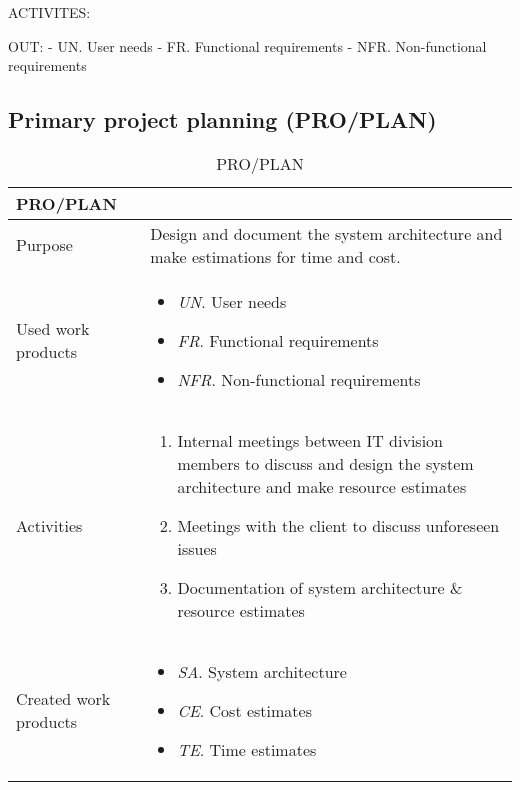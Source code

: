 ACTIVITES:


OUT:
    - UN. User needs
    - FR. Functional requirements
    - NFR. Non-functional requirements

\newpage
\subsection{Primary project planning (PRO/PLAN)}

\begin{table}[h!]
\begin{tabular}{l|p{}}
\hline
\textbf{PRO/PLAN}        & \textbf{} \\ \hline
Purpose & Design and document the system architecture and make estimations for time and cost.   \\ \hline
Used work products    &      
\begin{itemize}
    \item \textit{UN}. User needs
    \item \textit{FR}. Functional requirements
    \item \textit{NFR}. Non-functional requirements
\end{itemize}
\\ \hline
Activities            &   
\begin{enumerate}
    \item Internal meetings between IT division members to discuss and design the system architecture and make resource estimates
    \item Meetings with the client to discuss unforeseen issues
    \item Documentation of system architecture \& resource estimates
\end{enumerate}
\\ \hline
Created work products &     
\begin{itemize}
    \item \textit{SA}. System architecture
    \item \textit{CE}. Cost estimates
    \item \textit{TE}. Time estimates
\end{itemize}
\end{tabular}
\caption{PRO/PLAN}
\label{pro/plan}
\end{table}

\newpage

